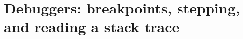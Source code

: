 \chapter{Debuggers: breakpoints, stepping, and reading a stack trace}
\label{ch:debuggers-breakpoints-stepping-and}

